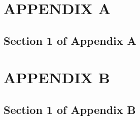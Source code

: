 \chapter{APPENDIX A}
\section{Section 1 of Appendix A}

\chapter{APPENDIX B}
\section{Section 1 of Appendix B}